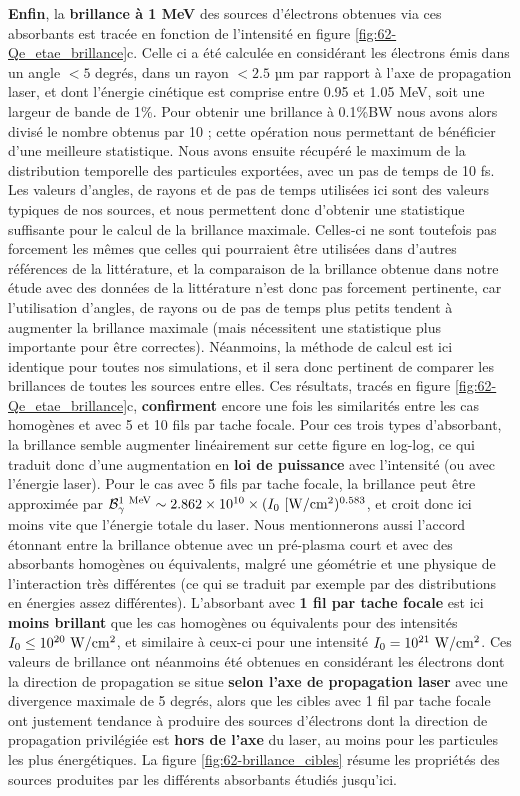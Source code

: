 \begin{refsection}
\textbf{Enfin}, la \textbf{brillance à 1 MeV} des sources d'électrons obtenues via ces absorbants est tracée en fonction de l'intensité en figure \ref{fig:62-Qe_etae_brillance}c. Celle ci a été calculée en considérant les électrons émis dans un angle $<5$ degrés, dans un rayon $<2.5$ µm par rapport à l'axe de propagation laser, et dont l'énergie cinétique est comprise entre 0.95 et 1.05 MeV, soit une largeur de bande de 1\%. Pour obtenir une brillance à 0.1\%BW nous avons alors divisé le nombre obtenus par 10 ; cette opération nous permettant de bénéficier d'une meilleure statistique. Nous avons ensuite récupéré le maximum de la distribution temporelle des particules exportées, avec un pas de temps de 10 fs. 
Les valeurs d'angles, de rayons et de pas de temps utilisées ici sont des valeurs typiques de nos sources, et nous permettent donc d'obtenir une statistique suffisante pour le calcul de la brillance maximale. Celles-ci ne sont toutefois pas forcement les mêmes que celles qui pourraient être utilisées dans d'autres références de la littérature, et la comparaison de la brillance obtenue dans notre étude avec des données de la littérature n'est donc pas forcement pertinente, car l'utilisation d'angles, de rayons ou de pas de temps plus petits tendent à augmenter la brillance maximale (mais nécessitent une statistique plus importante pour être correctes). Néanmoins, la méthode de calcul est ici identique pour toutes nos simulations, et il sera donc pertinent de comparer les brillances de toutes les sources entre elles.
Ces résultats, tracés en figure \ref{fig:62-Qe_etae_brillance}c, \textbf{confirment} encore une fois les similarités entre les cas homogènes et avec 5 et 10 fils par tache focale. Pour ces trois types d'absorbant, la brillance semble augmenter linéairement sur cette figure en log-log, ce qui traduit donc d'une augmentation en \textbf{loi de puissance} avec l'intensité (ou avec l'énergie laser). Pour le cas avec 5 fils par tache focale, la brillance peut être approximée par $\mathcal{B}_\gamma^{1 ~ \rm{MeV}} \sim 2.862 \times 10^{10} \times (I_0 ~ \rm{[W/cm^2})^{0.583}$, et croit donc ici moins vite que l'énergie totale du laser. Nous mentionnerons aussi l'accord étonnant entre la brillance obtenue avec un pré-plasma court et avec des absorbants homogènes ou équivalents, malgré une géométrie et une physique de l'interaction très différentes (ce qui se traduit par exemple par des distributions en énergies assez différentes). L'absorbant avec \textbf{1 fil par tache focale} est ici \textbf{moins brillant} que les cas homogènes ou équivalents pour des intensités $I_0 \leq 10^{20} ~ \rm W/cm^2$, et similaire à ceux-ci pour une intensité $I_0 = 10^{21} ~ \rm W/cm^2$. Ces valeurs de brillance ont néanmoins été obtenues en considérant les électrons dont la direction de propagation se situe \textbf{selon l'axe de propagation laser} avec une divergence maximale de 5 degrés, alors que les cibles avec 1 fil par tache focale ont justement tendance à produire des sources d'électrons dont la direction de propagation privilégiée est \textbf{hors de l'axe} du laser, au moins pour les particules les plus énergétiques. La figure \ref{fig:62-brillance_cibles} résume les propriétés des sources produites par les différents absorbants étudiés jusqu'ici.


\end{refsection}

